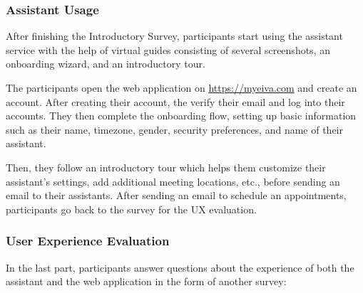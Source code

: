\documentclass{article}
\begin{document}
\subsubsection{Assistant Usage}

After finishing the Introductory Survey, participants start using the assistant service with the help of virtual guides consisting of several screenshots, an onboarding wizard, and an introductory tour.

The participants open the web application on \url{https://myeiva.com} and create an account. After creating their account, the verify their email and log into their accounts. They then complete the onboarding flow, setting up basic information such as their name, timezone, gender, security preferences, and name of their assistant.

Then, they follow an introductory tour which helps them customize their assistant's settings, add additional meeting locations, etc., before sending an email to their assistants. After sending an email to schedule an appointments, participants go back to the survey for the UX evaluation.

\subsubsection{User Experience Evaluation}

In the last part, participants answer questions about the experience of both the assistant and the web application in the form of another survey:
\end{document}
